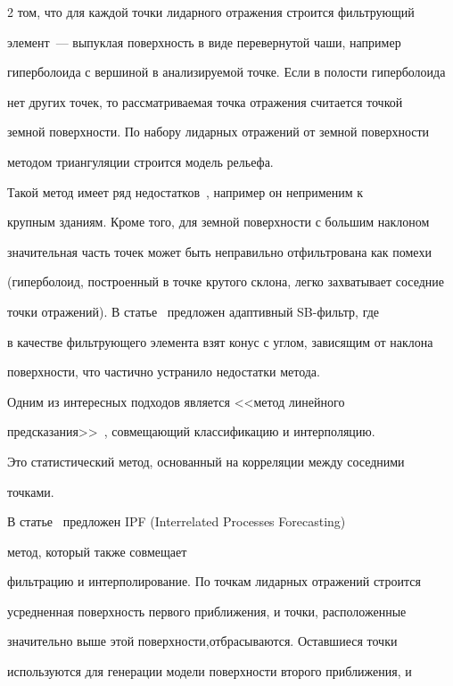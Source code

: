 \begin{multicols}{2}
том, что для каждой точки лидарного отражения строится фильтрующий 

элемент~--- выпуклая поверхность в виде перевернутой чаши, например 

гиперболоида с вершиной в анализируемой точке. Если в полости гиперболоида 

нет других точек, то рассматриваемая точка отражения считается точкой 

земной поверхности. По набору лидарных отражений от земной поверхности 

методом триангуляции строится модель рельефа.

   

   Такой метод имеет ряд недостатков~\cite{10su}, например он неприменим к 

крупным зданиям. Кроме того, для земной поверхности с большим наклоном 

значительная часть точек может быть неправильно отфильтрована как помехи 

(гиперболоид, построенный в точке крутого склона, легко захватывает соседние 

точки отражений). В статье~\cite{10su} предложен адаптивный SB-фильтр, где 

в качестве фильт\-ру\-юще\-го элемента взят конус с углом, зависящим от наклона 

поверхности, что частично устранило недостатки метода.



   Одним из интересных подходов является <<метод линейного 

предсказания>>~\cite{11su}, совмещающий классификацию и интерполяцию. 

Это статистический метод, основанный на корреляции между соседними 

точками.

   

В статье~\cite{12su} предложен IPF (Interrelated Proc\-esses Forecasting)

метод, который также совмещает\linebreak 

фильтрацию и интерполирование. По точкам лидарных отражений строится 

усредненная по\-верх\-ность первого приближения, и точки, расположенные 

значительно выше этой по\-верх\-ности,\linebreak отбрасываются. Оставшиеся точки 

используются для генерации модели поверхности второго приближения, и 


\end{multicols}
